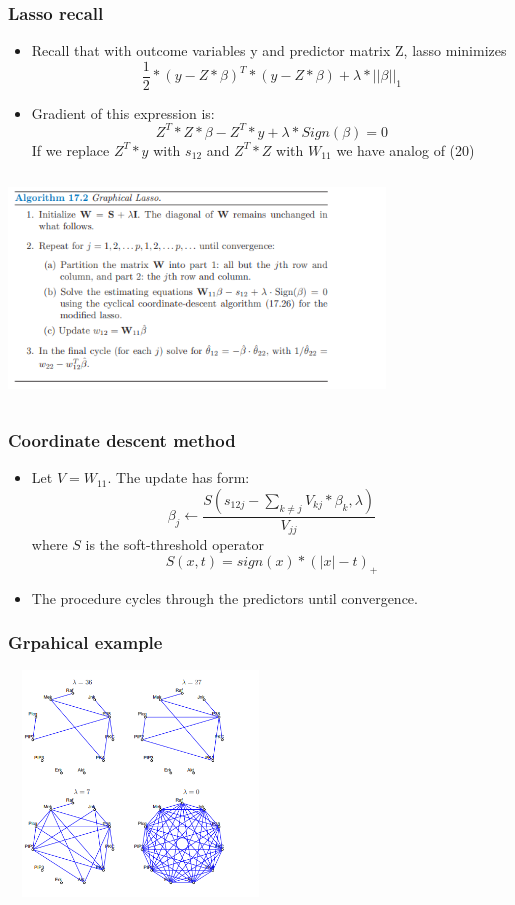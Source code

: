 \documentclass{beamer}
\begin{document}
\begin{frame}
\frametitle{Lasso recall}
\begin{itemize}
\item Recall that with outcome variables y and predictor matrix Z, lasso minimizes
\begin{equation}
\frac{1}{2} * (y - Z * \beta)^T * (y - Z * \beta) + \lambda * ||\beta||_1
\end{equation}
\item Gradient of this expression is:
\begin{equation}
Z^T*Z*\beta - Z^T * y + \lambda * Sign(\beta) = 0
\end{equation}
If we replace $Z^T *y$ with $s_{12}$ and $Z^T * Z$ with $W_{11}$ we have analog of (20)
\end{itemize}
\end{frame}
\begin{frame}
\includegraphics[width=10cm, height=6cm]{Algorithm lasso}
\end{frame}

\begin{frame}
\frametitle{Coordinate descent method}
\begin{itemize}
\item Let $V=W_{11}$. The update has form:
\begin{equation}
\beta_j \leftarrow \frac{S(s_{12j}-\sum_{k \neq j}V_{kj}*\beta_k, \lambda)}{V_{jj}}
\end{equation}
where $S$ is the soft-threshold operator
\begin{equation}
S(x, t)=sign(x) * (|x| - t)_+
\end{equation}
\item The procedure cycles through the predictors until convergence.
\end{itemize}
\end{frame}

\begin{frame}
\frametitle{Grpahical example}
\includegraphics[width=7cm, height=6cm]{lasso solutions}
\end{frame}
\end{document}
